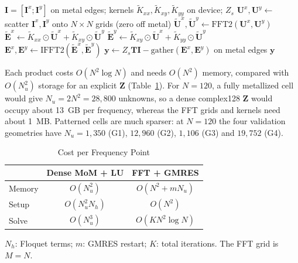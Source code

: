 \documentclass[10pt,conference]{IEEEtran}
\newcommand{\vect}[1]{\mathbf{#1}}
\begin{document}
	\begin{algorithm}[t]
		\caption{Matrix-free product $\vect{y}=\vect{A}\vect{I}$}
		\label{alg:matvec}
		\begin{algorithmic}[1]
			\Require $\vect{I}=[\vect{I}^x;\vect{I}^y]$ on metal edges; kernels
			$\tilde{K}_{xx},\tilde{K}_{xy},\tilde{K}_{yy}$ on device; $Z_s$
			\State $\vect{U}^x,\vect{U}^y\gets$ scatter $\vect{I}^x,\vect{I}^y$ onto
			$N\times N$ grids (zero off metal)
			\State $\tilde{\vect{U}}^x,\tilde{\vect{U}}^y\gets\mathrm{FFT2}(\vect{U}^x,\vect{U}^y)$
			\State $\tilde{\vect{E}}^x\gets\tilde{K}_{xx}\odot\tilde{\vect{U}}^x
			+\tilde{K}_{xy}\odot\tilde{\vect{U}}^y$
			\State $\tilde{\vect{E}}^y\gets\tilde{K}_{xy}\odot\tilde{\vect{U}}^x
			+\tilde{K}_{yy}\odot\tilde{\vect{U}}^y$
			\State $\vect{E}^x,\vect{E}^y\gets\mathrm{IFFT2}(\tilde{\vect{E}}^x,\tilde{\vect{E}}^y)$
			\State $\vect{y}\gets Z_s\vect{T}\vect{I}-\mathrm{gather}(\vect{E}^x,\vect{E}^y)$
			on metal edges
			\State \Return $\vect{y}$
		\end{algorithmic}
	\end{algorithm}
	
	Each product costs $O(N^2\log N)$ and needs $O(N^2)$ memory, compared with
	$O(N_u^2)$ storage for an explicit $\vect{Z}$ (Table~\ref{tab:complexity}).
	For $N=120$, a fully metallized cell would give $N_u=2N^2=28{,}800$
	unknowns, so a dense complex128 $\vect{Z}$ would occupy about 13~GB per
	frequency, whereas the FFT grids and kernels need about 1~MB.
	Patterned cells are much sparser: at $N=120$ the four validation geometries
	have $N_u=1{,}350$ (G1), $12{,}960$ (G2), $1{,}106$ (G3) and
	$19{,}752$ (G4).
	
	\begin{table}[t]
		\centering
		\caption{Cost per Frequency Point}
		\label{tab:complexity}
		\small
		\setlength{\tabcolsep}{3.5pt}
		\begin{tabular*}{\columnwidth}{@{\extracolsep{\fill}}lcc@{}}
			\hline
			& Dense MoM + LU & FFT + GMRES\\
			\hline
			Memory & $O(N_u^2)$ & $O(N^2{+}mN_u)$\\
			Setup & $O(N_u^2N_h)$ & $O(N^2)$\\
			Solve & $O(N_u^3)$ & $O(KN^2\log N)$\\
			\hline
		\end{tabular*}
		\vspace{1pt}
		{\raggedright\footnotesize $N_h$: Floquet terms; $m$: GMRES restart;
			$K$: total iterations. The FFT grid is $M=N$.\par}
	\end{table}
	
\end{document}
